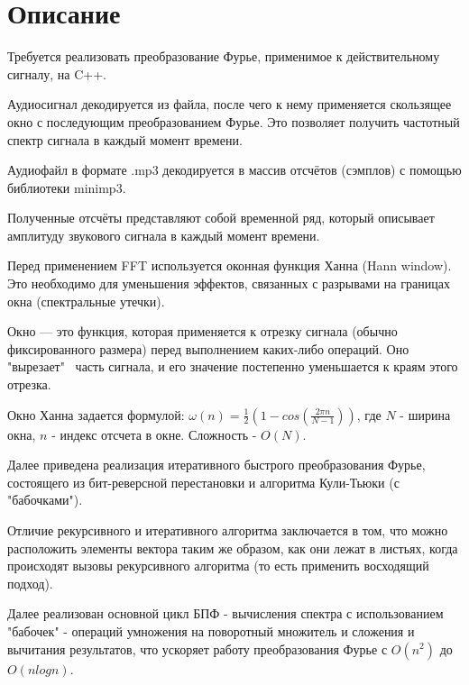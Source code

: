 \section{Описание}
Требуется реализовать преобразование Фурье, применимое к действительному сигналу, на C++.

Аудиосигнал декодируется из файла, после чего к нему применяется скользящее окно с последующим преобразованием Фурье. Это позволяет получить частотный спектр сигнала в каждый момент времени.

Аудиофайл в формате .mp3 декодируется в массив отсчётов (сэмплов) с помощью библиотеки minimp3.

Полученные отсчёты представляют собой временной ряд, который описывает амплитуду звукового сигнала в каждый момент времени.

Перед применением FFT используется оконная функция Ханна (Hann window). Это необходимо для уменьшения эффектов, связанных с разрывами на границах окна (спектральные утечки).

Окно — это функция, которая применяется к отрезку сигнала (обычно фиксированного размера) перед выполнением каких-либо операций. Оно "вырезает" \ часть сигнала, и его значение постепенно уменьшается к краям этого отрезка.

Окно Ханна задается формулой: $\omega(n) = \frac{1}{2} (1 - cos(\frac{2\pi n}{N - 1}))$, где $N$ - ширина окна, $n$ - индекс отсчета в окне. Сложность - $O(N)$.

Далее приведена реализация итеративного быстрого преобразования Фурье, состоящего из бит-реверсной перестановки и алгоритма Кули-Тьюки (с "бабочками").

Отличие рекурсивного и итеративного алгоритма заключается в том, что можно расположить элементы вектора таким же образом, как они лежат в листьях, когда происходят вызовы рекурсивного алгоритма (то есть применить восходящий подход).

Далее реализован основной цикл БПФ - вычисления спектра с использованием "бабочек" - операций умножения на поворотный множитель и сложения и вычитания результатов, что ускоряет работу преобразования Фурье с $O(n^2)$ до $O(nlogn)$. 

